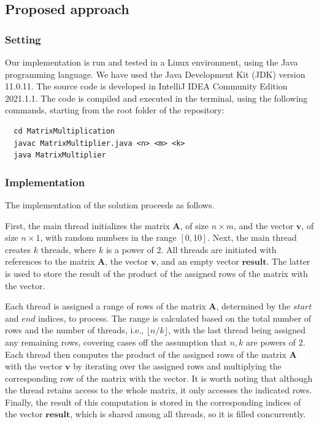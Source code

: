 \documentclass[acmlarge]{acmart}
\begin{document}
\subsection{Proposed approach}

\subsubsection{Setting}
Our implementation is run and tested in a Linux environment, using the Java programming language. We have used the Java Development Kit (JDK) version 11.0.11. The source code is developed in IntelliJ IDEA Community Edition 2021.1.1. The code is compiled and executed in the terminal, using the following commands, starting from the root folder of the repository:
\begin{verbatim}
  cd MatrixMultiplication
  javac MatrixMultiplier.java <n> <m> <k>
  java MatrixMultiplier
\end{verbatim}

\subsubsection{Implementation}
The implementation of the solution proceeds as follows.

First, the main thread initializes the matrix $\mathbf{A}$, of size $n \times m$, and the vector $\mathbf{v}$, of size $n \times 1$, with random numbers in the range $[0, 10]$. Next, the main thread creates $k$ threads, where $k$ is a power of 2. All threads are initiated with references to the matrix $\mathbf{A}$, the vector $\mathbf{v}$, and an empty vector $\mathbf{result}$. The latter is used to store the result of the product of the assigned rows of the matrix with the vector.

Each thread is assigned a range of rows of the matrix $\mathbf{A}$, determined by the $start$ and $end$ indices, to process. The range is calculated based on the total number of rows and the number of threads, i.e., $\lfloor n/k \rfloor$, with the last thread being assigned any remaining rows, covering cases off the assumption that $n,k$ are powers of 2. Each thread then computes the product of the assigned rows of the matrix $\mathbf{A}$ with the vector $\mathbf{v}$ by iterating over the assigned rows and multiplying the corresponding row of the matrix with the vector. It is worth noting that although the thread retains access to the whole matrix, it only accesses the indicated rows. Finally, the result of this computation is stored in the corresponding indices of the vector $\mathbf{result}$, which is shared among all threads, so it is filled concurrently.
\end{document}
